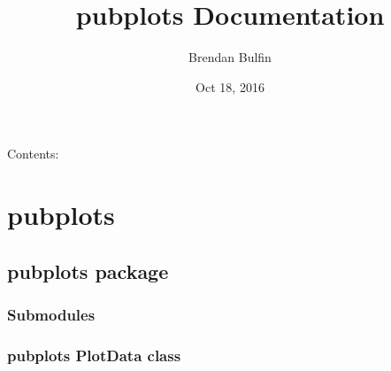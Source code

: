 \documentclass[letterpaper,10pt,english]{sphinxmanual}
\title{pubplots Documentation}
\date{Oct 18, 2016}
\author{Brendan Bulfin}
\begin{document}
\maketitle
\tableofcontents
{}\label{index::doc}


Contents:


\chapter{pubplots}
\label{modules:welcome-to-pubplots-s-documentation}\label{modules:pubplots}\label{modules::doc}

\section{pubplots package}
\label{pubplots:pubplots-package}\label{pubplots::doc}

\subsection{Submodules}
\label{pubplots:submodules}

\subsection{pubplots PlotData class}
\label{pubplots:pubplots-plotdata-class}
\end{document}
